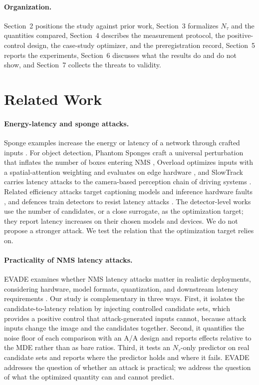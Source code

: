 \documentclass[a4paper,fleqn]{cas-dc}
\newcommand{\Ntau}{N_{\tau}}
\begin{document}
\paragraph{Organization.}
Section~2 positions the study against prior work, Section~3 formalizes $\Ntau$ and the quantities compared, Section~4 describes the measurement protocol, the positive-control design, the case-study optimizer, and the preregistration record, Section~5 reports the experiments, Section~6 discusses what the results do and do not show, and Section~7 collects the threats to validity.

\section{Related Work}
\paragraph{Energy-latency and sponge attacks.}
Sponge examples increase the energy or latency of a network through crafted inputs \cite{shumailov2021sponge}. For object detection, Phantom Sponges craft a universal perturbation that inflates the number of boxes entering NMS \cite{phantom2023}, Overload optimizes inputs with a spatial-attention weighting and evaluates on edge hardware \cite{overload2024}, and SlowTrack carries latency attacks to the camera-based perception chain of driving systems \cite{slowtrack2024}. Related efficiency attacks target captioning models \cite{nicgslowdown2022} and inference hardware faults \cite{bitflip2025}, and defences train detectors to resist latency attacks \cite{underload2025}. The detector-level works use the number of candidates, or a close surrogate, as the optimization target; they report latency increases on their chosen models and devices. We do not propose a stronger attack. We test the relation that the optimization target relies on.

\paragraph{Practicality of NMS latency attacks.}
EVADE examines whether NMS latency attacks matter in realistic deployments, considering hardware, model formats, quantization, and downstream latency requirements \cite{evade2025}. Our study is complementary in three ways. First, it isolates the candidate-to-latency relation by injecting controlled candidate sets, which provides a positive control that attack-generated inputs cannot, because attack inputs change the image and the candidates together. Second, it quantifies the noise floor of each comparison with an A/A design and reports effects relative to the MDE rather than as bare ratios. Third, it tests an $\Ntau$-only predictor on real candidate sets and reports where the predictor holds and where it fails. EVADE addresses the question of whether an attack is practical; we address the question of what the optimized quantity can and cannot predict.
\end{document}
